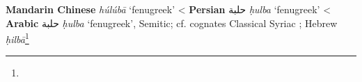 \begin{etymology}\label{ety:huluba}
\textbf{Mandarin Chinese}  \textit{húlúbā} `fenugreek'
< \textbf{Persian} {حلبة} \textit{ḥulba} `fenugreek'
< \textbf{Arabic} {حلبة} \textit{ḥulba} `fenugreek', Semitic; cf. cognates Classical Syriac ; Hebrew  \textit{ḥilbā}\footnote{}
\end{etymology}